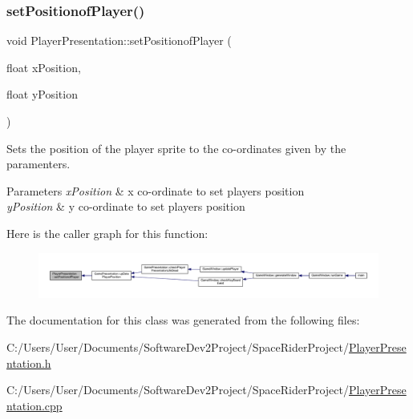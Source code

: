 \subsubsection{\texorpdfstring{set\+Positionof\+Player()}{setPositionofPlayer()}}
{\footnotesize\ttfamily void Player\+Presentation\+::set\+Positionof\+Player (\begin{DoxyParamCaption}\item[{float}]{x\+Position,  }\item[{float}]{y\+Position }\end{DoxyParamCaption})}



Sets the position of the player sprite to the co-\/ordinates given by the paramenters. 


\begin{DoxyParams}{Parameters}
{\em x\+Position} & x co-\/ordinate to set players position \\
\hline
{\em y\+Position} & y co-\/ordinate to set players position \\
\hline
\end{DoxyParams}
Here is the caller graph for this function\+:\nopagebreak
\begin{figure}[H]
\begin{center}
\leavevmode
\includegraphics[width=350pt]{class_player_presentation_aef6ba74848a34fb93528062bda98059e_icgraph}
\end{center}
\end{figure}


The documentation for this class was generated from the following files\+:\begin{DoxyCompactItemize}
\item 
C\+:/\+Users/\+User/\+Documents/\+Software\+Dev2\+Project/\+Space\+Rider\+Project/\hyperlink{_player_presentation_8h}{Player\+Presentation.\+h}\item 
C\+:/\+Users/\+User/\+Documents/\+Software\+Dev2\+Project/\+Space\+Rider\+Project/\hyperlink{_player_presentation_8cpp}{Player\+Presentation.\+cpp}\end{DoxyCompactItemize}
